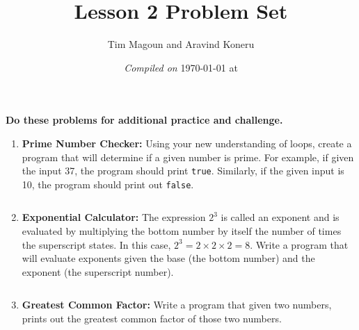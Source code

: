 \documentclass[11pt,fleqn]{article}
\begin{document}
\title{Lesson 2 Problem Set}%
\author{Tim Magoun and Aravind Koneru}
\date{\textit{Compiled on} \today \hspace{1mm} at \currenttime}
\maketitle

\begin{center}
\textbf{Do these problems for additional practice and challenge.}
\end{center}

\begin{enumerate}
\item
\textbf{Prime Number Checker:} Using your new understanding of loops, create a program that will determine
if a given number is prime. For example, if given the input 37, the program should print \texttt{true}.
Similarly, if the given input is 10, the program should print out \texttt{false}.

\inputminted{java}{../../src/ps_2/prime.java}

\item
\textbf{Exponential Calculator:} The expression $2^3$ is called an exponent and is evaluated by multiplying
the bottom number by itself the number of times the superscript states. In this case, $2^3 = 2 \times
2 \times 2 = 8$. Write a program that will evaluate exponents given the base (the bottom number) and the
exponent (the superscript number). 

\inputminted{java}{../../src/ps_2/exp_calc.java}

\item
\textbf{Greatest Common Factor:} Write a program that given two numbers, prints out the greatest common
factor of those two numbers. 

\inputminted{java}{../../src/ps_2/gcf.java}



\end{enumerate}
\end{document}
